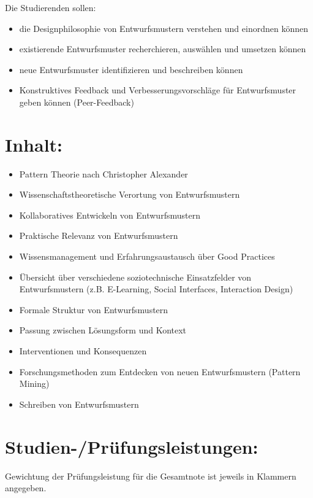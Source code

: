 Die Studierenden sollen:

\begin{itemize}
\tightlist
\item
  die Designphilosophie von Entwurfsmustern verstehen und einordnen
  können
\item
  existierende Entwurfsmuster recherchieren, auswählen und umsetzen
  können
\item
  neue Entwurfsmuster identifizieren und beschreiben können
\item
  Konstruktives Feedback und Verbesserungsvorschläge für Entwurfsmuster
  geben können (Peer-Feedback)
\end{itemize}

\section*{Inhalt:}\label{inhalt-12}

\begin{itemize}
\tightlist
\item
  Pattern Theorie nach Christopher Alexander
\item
  Wissenschaftstheoretische Verortung von Entwurfsmustern
\item
  Kollaboratives Entwickeln von Entwurfsmustern
\item
  Praktische Relevanz von Entwurfsmustern
\item
  Wissensmanagement und Erfahrungsaustausch über Good Practices
\item
  Übersicht über verschiedene soziotechnische Einsatzfelder von
  Entwurfsmustern (z.B. E-Learning, Social Interfaces, Interaction
  Design)
\item
  Formale Struktur von Entwurfsmustern
\item
  Passung zwischen Lösungsform und Kontext
\item
  Interventionen und Konsequenzen
\item
  Forschungsmethoden zum Entdecken von neuen Entwurfsmustern (Pattern
  Mining)
\item
  Schreiben von Entwurfsmustern
\end{itemize}

\section*{Studien-/Prüfungsleistungen:}\label{studien-pruxfcfungsleistungen-12}

Gewichtung der Prüfungsleistung für die Gesamtnote ist jeweils in
Klammern angegeben.

